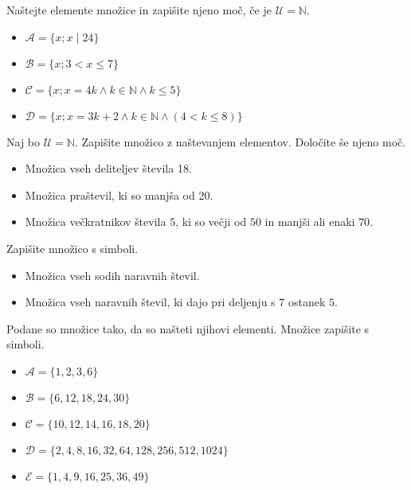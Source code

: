     
        \begin{naloga}
            Naštejte elemente množice in zapišite njeno moč, če je $\mathcal{U}=\mathbb{N}$.
            \begin{itemize}
                \item $\mathcal{A}=\{x; x\mid 24\}$
                \item $\mathcal{B}=\{x; 3<x\leq 7\}$
                \item $\mathcal{C}=\{x; x=4k\land k\in\mathbb{N}\land k\leq 5\}$
                \item $\mathcal{D}=\{x; x=3k+2\land k\in\mathbb{N}\land (4<k\leq 8)\}$
            \end{itemize}
        \end{naloga}

        \begin{naloga}
            Naj bo $\mathcal{U}=\mathbb{N}$. Zapišite množico z naštevanjem elementov.
            Določite še njeno moč.
            \begin{itemize}
                \item Množica vseh deliteljev števila 18.
                \item Množica praštevil, ki so manjša od 20.
                \item Množica večkratnikov števila $5$, ki so večji od $50$ in manjši ali enaki $70$.
            \end{itemize}
        \end{naloga}

    

    
        \begin{naloga}
            Zapišite množico s simboli.
            \begin{itemize}
                \item Množica vseh sodih naravnih števil.
                \item Množica vseh naravnih števil, ki dajo pri deljenju s $7$ ostanek $5$.
            \end{itemize}
        \end{naloga}

        \begin{naloga}
            Podane so množice tako, da so našteti njihovi elementi. Množice zapišite s simboli.
            \begin{itemize}
                \item $\mathcal{A}=\{1,2,3,6\}$
                \item $\mathcal{B}=\{6, 12, 18, 24, 30\}$
                \item $\mathcal{C}=\{10, 12, 14, 16, 18, 20\}$
                \item $\mathcal{D}=\{2, 4, 8, 16, 32, 64, 128, 256, 512, 1024\}$
                \item $\mathcal{E}=\{1,4,9,16,25,36,49\}$
            \end{itemize}
        \end{naloga}

